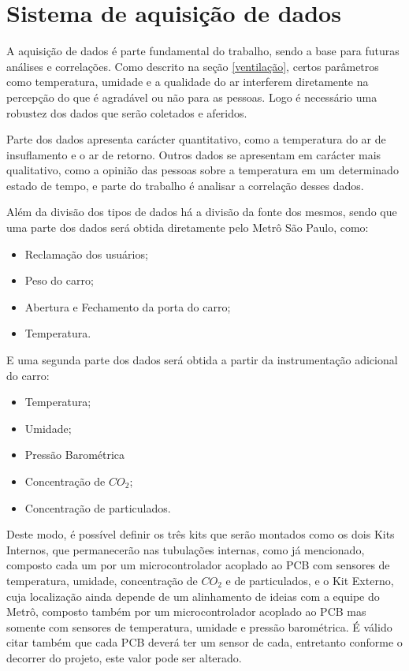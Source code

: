 \documentclass[acronym,symbols]{fei}
\begin{document}
\section{Sistema de aquisição de dados}

A aquisição de dados é parte fundamental do trabalho, sendo a base para futuras análises e correlações. Como descrito na seção \ref{ventilação}, certos parâmetros como temperatura, umidade e a qualidade do ar interferem diretamente na percepção do que é agradável ou não para as pessoas. Logo é necessário uma robustez dos dados que serão coletados e aferidos.

Parte dos dados apresenta carácter quantitativo, como a temperatura do ar de insuflamento e o ar de retorno. Outros dados se apresentam em carácter mais qualitativo, como a opinião das pessoas sobre a temperatura em um determinado estado de tempo, e parte do trabalho é analisar a correlação desses dados.

Além da divisão dos tipos de dados há a divisão da fonte dos mesmos, sendo que uma parte dos dados será obtida diretamente pelo Metrô São Paulo, como:

\begin{itemize}
    \item Reclamação dos usuários;
    \item Peso do carro;
    \item Abertura e Fechamento da porta do carro;
    \item Temperatura.
\end{itemize}    

E uma segunda parte dos dados será obtida a partir da instrumentação adicional do carro:

\begin{itemize}
    \item Temperatura;   
    \item Umidade; 
    \item Pressão Barométrica
    \item Concentração de $CO_2$;  
    \item Concentração de particulados.
\end{itemize}    

Deste modo, é possível definir os três kits que serão montados como os dois Kits Internos, que permanecerão nas tubulações internas, como já mencionado, composto cada um por um microcontrolador acoplado ao PCB com sensores de temperatura, umidade, concentração de $CO_2$ e de particulados, e o Kit Externo, cuja localização ainda depende de um alinhamento de ideias com a equipe do Metrô, composto também por um microcontrolador acoplado ao PCB mas somente com sensores de temperatura, umidade e pressão barométrica. É válido citar também que cada PCB deverá ter um sensor de cada, entretanto conforme o decorrer do projeto, este valor pode ser alterado. 
\end{document}
